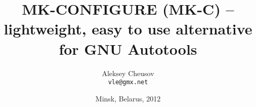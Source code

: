 \documentclass[hyperref={colorlinks=true}]{beamer}
\title{MK-CONFIGURE (MK-C) -- lightweight,
  easy to use alternative for GNU Autotools}
\author{Aleksey Cheusov \\ \texttt{vle@gmx.net}}
\date{Minsk, Belarus, 2012}
\begin{document}

\newenvironment{Code}[1]%
              {\Verbatim[label=\bf{#1},frame=single,%
                  fontsize=\small,%
                  commandchars=\\\{\}]}%
              {\endVerbatim}


\newenvironment{CodeNoLabel}%
               {\Verbatim[frame=single,%
                   fontsize=\small,%
                   commandchars=\\\{\}]}%
               {\endVerbatim}

\newenvironment{CodeNoLabelSmallest}%
               {\Verbatim[frame=single,%
                   fontsize=\footnotesize,%
                   commandchars=\\\{\}]}%
               {\endVerbatim}
\newenvironment{CodeLarge}%
               {\Verbatim[frame=single,%
                   fontsize=\large,%
                   commandchars=\\\{\}]}%
               {\endVerbatim}

\newcommand{\prompt}[1]{{\bf{#1}}}
\newcommand{\h}[1]{{\bf{#1}}}
\newcommand{\URL}[1]{\textbf{#1}}
\newcommand{\AutohellFile}[1]{\textcolor{red}{#1}}
\newcommand{\MKCfile}[1]{\textcolor{green}{#1}}
\newcommand{\ModuleName}[1]{\textbf{#1}\textnormal{}}
\newcommand{\ProgName}[1]{\textbf{#1}\textnormal{}}
\newcommand{\ProjectName}[1]{\textbf{#1}\textnormal{}}
\newcommand{\PackageName}[1]{\textbf{#1}\textnormal{}}
\newcommand{\MKC}[1]{\large\textsf{#1}\textnormal{}\normalsize}



\begin{frame}
  \titlepage
\end{frame}
\end{document}
